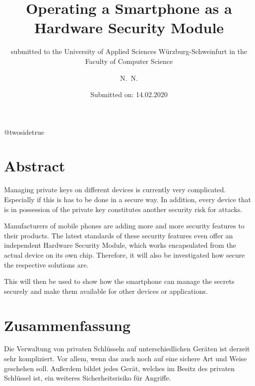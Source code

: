 \documentclass[12pt,oneside,a4paper,parskip]{scrbook}
\makeatletter
\def\BaAuthor{Achim Winter}
\def\BaAuthorStudyProgram{Computer Science}
\def\BaType{Bachelor thesis}
\def\BaTitle{Operating a Smartphone as a Hardware Security Module}
\def\BaSupervisorOne{Prof.\ Dr.\ Junker-Schilling}
\def\BaSupervisorTwo{Prof.\ Dr.\ Huffstadt}
\def\BaDeadline{14.02.2020}
\def\ShowBaAuthor{\BaAuthor}
\def\ShowBaAuthor{N.~N.}
\newcommand*{\forcetwosidetitle}[1][1]{%
 \begingroup
   \cleardoubleoddpage
   \KOMAoptions{titlepage=true}%
   \csname @twosidetrue\endcsname
   \maketitle[{#1}]
 \endgroup
}
\makeatother
\begin{document}


\frontmatter
\titlehead{%
  {University of applied Sciences W\"{u}rzburg-Schweinfurt\\
   Faculty of Computer Science and Business Informatics}}
\subject{\BaType}
\title{\BaTitle\\[15mm]}
\subtitle{\normalsize{submitted to the University of Applied Sciences W\"{u}rzburg-Schweinfurt in the Faculty of \BaAuthorStudyProgram}}
\author{\ShowBaAuthor}
\date{\normalsize{Submitted on: \BaDeadline}}
\publishers{
  \normalsize{First Supervisor: \BaSupervisorOne}\\
  \normalsize{Second Supervisor: \BaSupervisorTwo}\\
}

\forcetwosidetitle



\section*{Abstract}
Managing private keys on different devices is currently very complicated. Especially if this is has to be done in a secure way. In addition, every device that is in possession of the private key constitutes another security risk for attacks. 

Manufacturers of mobile phones are adding more and more security features to their products. The latest standards of these security features even offer an independent Hardware Security Module, which works encapsulated from the actual device on its own chip. Therefore, it will also be investigated how secure the respective solutions are.

This will then be used to show how the smartphone can manage the secrets securely and make them available for other devices or applications.



\section*{Zusammenfassung}
Die Verwaltung von privaten Schlüsseln auf unterschiedlichen Geräten ist derzeit sehr kompliziert. Vor allem, wenn das auch noch auf eine sichere Art und Weise geschehen soll. Außerdem bildet jedes Gerät, welches im Besitz des privaten Schlüssel ist, ein weiteres Sicherheitsrisiko für Angriffe. 
\end{document}
